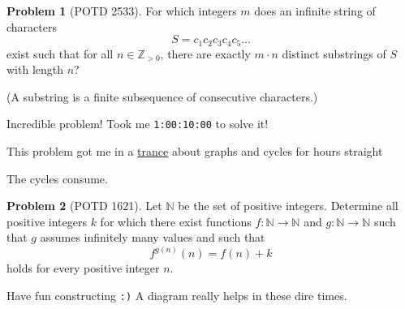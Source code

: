 \documentclass[11pt]{article} %
\theoremstyle{definition}
\newtheorem{problem}{Problem}
\theoremstyle{remark}
\begin{document}
\begin{problem}[POTD 2533]
    For which integers \(m\) does an infinite string of characters
        \[S = c_1c_2c_3c_4c_5...\]
    exist such that for all \(n \in \mathbb{Z}_{> 0}\), there are exactly \(m\cdot n\) distinct substrings of \(S\) with length \(n\)?

    (A substring is a finite subsequence of consecutive characters.)
    \begin{talks}
        \begin{talk}
            Incredible problem! Took me \texttt{1:00:10:00} to solve it!
        \end{talk}
        \begin{talk}
            This problem got me in a \href{https://youtu.be/1-F1oCFPiIM?t=8298}{trance} about graphs and cycles for hours straight
        \end{talk}
        \begin{talk}
            The cycles consume.
        \end{talk}
    \end{talks}
\end{problem}

\begin{problem}[POTD 1621]
    Let \(\mathbb{N}\) be the set of positive integers. Determine all positive integers \(k\) for which there exist functions \(f : \mathbb{N} \to \mathbb{N}\) and \(g : \mathbb{N} \to  \mathbb{N}\) such that \(g\) assumes infinitely many values and such that \[f^{g(n)}(n) = f(n) + k\] holds for every positive integer \(n\).
    \begin{talks}
        \begin{talk}
            Have fun constructing \texttt{:)} A diagram really helps in these dire times.
        \end{talk}
    \end{talks}
\end{problem}
\end{document}
